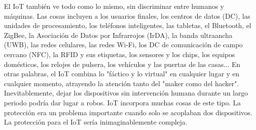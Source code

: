 El IoT también ve todo como lo mismo, sin discriminar entre humanos y máquinas. Las cosas incluyen a los usuarios finales, los centros de datos (DC), las unidades de procesamiento, los teléfonos inteligentes, las tabletas, el Bluetooth, el ZigBee, la Asociación de Datos por Infrarrojos (IrDA), la banda ultraancha (UWB), las redes celulares, las redes Wi-Fi, los DC de comunicación de campo cercano (NFC), la RFID y sus etiquetas, los sensores y los chips, los equipos domésticos, los relojes de pulsera, los vehículos y las puertas de las casas... En otras palabras, el IoT combina lo "fáctico y lo virtual" en cualquier lugar y en cualquier momento, atrayendo la atención tanto del "maker como del hacker". Inevitablemente, dejar los dispositivos sin intervención humana durante un largo periodo podría dar lugar a robos. IoT incorpora muchas cosas de este tipo. La protección era un problema importante cuando solo se acoplaban dos dispositivos. La protección para el IoT sería inimaginablemente compleja.\\

